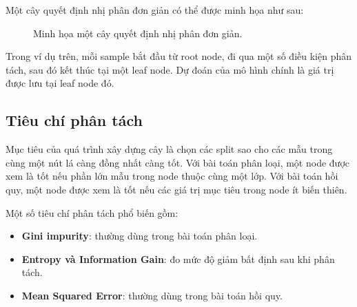 Một cây quyết định nhị phân đơn giản có thể được minh họa như sau:

\begin{figure}[h]
    \centering
    \caption{Minh họa một cây quyết định nhị phân đơn giản.}
    \label{fig:decision_tree_example}
\end{figure}

Trong ví dụ trên, mỗi sample bắt đầu từ root node, đi qua một số điều kiện phân tách, sau đó kết thúc tại một leaf node. Dự đoán của mô hình chính là giá trị được lưu tại leaf node đó.

\subsection{Tiêu chí phân tách}

Mục tiêu của quá trình xây dựng cây là chọn các split sao cho các mẫu trong cùng một nút lá càng đồng nhất càng tốt. Với bài toán phân loại, một node được xem là tốt nếu phần lớn mẫu trong node thuộc cùng một lớp. Với bài toán hồi quy, một node được xem là tốt nếu các giá trị mục tiêu trong node ít biến thiên.

Một số tiêu chí phân tách phổ biến gồm:

\begin{itemize}
    \item \textbf{Gini impurity}: thường dùng trong bài toán phân loại.
    \item \textbf{Entropy và Information Gain}: đo mức độ giảm bất định sau khi phân tách.
    \item \textbf{Mean Squared Error}: thường dùng trong bài toán hồi quy.
\end{itemize}

